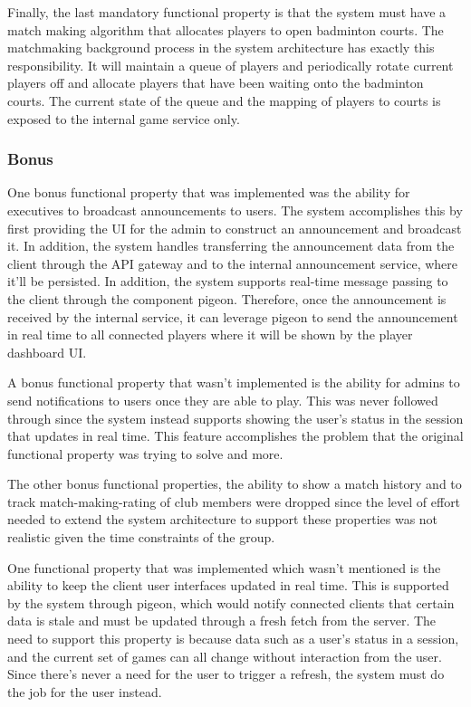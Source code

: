 \documentclass{article}
\begin{document}
Finally, the last mandatory functional property is that the system must have a match making algorithm that allocates players to open badminton courts. The matchmaking background process in the system architecture has exactly this responsibility. It will maintain a queue of players and periodically rotate current players off and allocate players that have been waiting onto the badminton courts. The current state of the queue and the mapping of players to courts is exposed to the internal game service only.

\subsubsection{Bonus}
One bonus functional property that was implemented was the ability for executives to broadcast announcements to users. The system accomplishes this by first providing the UI for the admin to construct an announcement and broadcast it. In addition, the system handles transferring the announcement data from the client through the API gateway and to the internal announcement service, where it'll be persisted. In addition, the system supports real-time message passing to the client through the component pigeon. Therefore, once the announcement is received by the internal service, it can leverage pigeon to send the announcement in real time to all connected players where it will be shown by the player dashboard UI.

A bonus functional property that wasn't implemented is the ability for admins to send notifications to users once they are able to play. This was never followed through since the system instead supports showing the user's status in the session that updates in real time. This feature accomplishes the problem that the original functional property was trying to solve and more.

The other bonus functional properties, the ability to show a match history and to track match-making-rating of club members were dropped since the level of effort needed to extend the system architecture to support these properties was not realistic given the time constraints of the group.

One functional property that was implemented which wasn't mentioned is the ability to keep the client user interfaces updated in real time. This is supported by the system through pigeon, which would notify connected clients that certain data is stale and must be updated through a fresh fetch from the server. The need to support this property is because data such as a user's status in a session, and the current set of games can all change without interaction from the user. Since there's never a need for the user to trigger a refresh, the system must do the job for the user instead.
\end{document}

